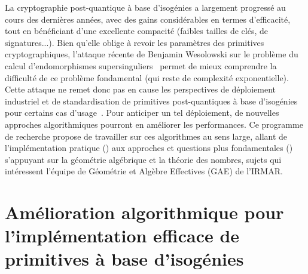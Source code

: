 \documentclass[a4paper,10pt]{scrartcl}
\theoremstyle{definition}
\theoremstyle{plain}
\theoremstyle{definition}
\renewcommand{\(}{\left(}
\renewcommand{\)}{\right)}
\begin{document}
\title{}

\author{Pierrick Dartois}

\date{Octobre 2026}

\subtitle{Algorithmique efficace et sécurisée pour le calcul d'isogénies entre variétés abéliennes et courbes elliptiques en cryptographie}

\maketitle


La cryptographie post-quantique à base d'isogénies a largement progressé au cours des dernières années, avec des gains considérables en termes d'efficacité, tout en bénéficiant d'une excellente compacité (faibles tailles de clés, de signatures...). Bien qu'elle oblige à revoir les paramètres des primitives cryptographiques, l'attaque récente de Benjamin Wesolowski sur le problème du calcul d'endomorphismes supersinguliers~\cite{Bweso_attack} permet de mieux comprendre la difficulté de ce problème fondamental (qui reste de complexité exponentielle). Cette attaque ne remet donc pas en cause les perspectives de déploiement industriel et de standardisation de primitives post-quantiques à base d'isogénies pour certains cas d'usage~\cite{SQIsign_in_TLS}. Pour anticiper un tel déploiement, de nouvelles approches algorithmiques pourront en améliorer les performances. Ce programme de recherche propose de travailler sur ces algorithmes au sens large, allant de l'implémentation pratique () aux approches et questions plus fondamentales () s'appuyant sur la géométrie algébrique et la théorie des nombres, sujets qui intéressent l'équipe de Géométrie et Algèbre Effectives (GAE) de l'IRMAR. 

\section{Amélioration algorithmique pour l'implémentation efficace de primitives à base d'isogénies}\label{SecAlgImpl}
\end{document}
